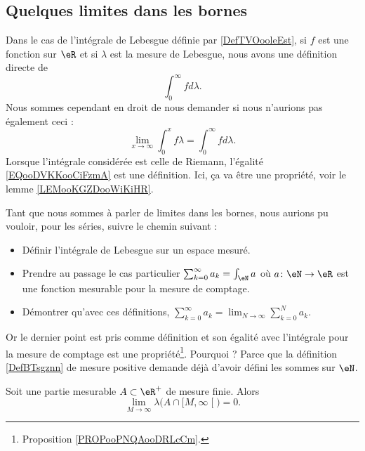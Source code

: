 \subsection{Quelques limites dans les bornes}

Dans le cas de l'intégrale de Lebesgue définie par \ref{DefTVOooleEst}, si \( f\) est une fonction sur \( \eR\) et si \( \lambda\) est la mesure de Lebesgue, nous avons une définition directe de
\begin{equation}
	\int_{0}^{\infty}fd\lambda.
\end{equation}
Nous sommes cependant en droit de nous demander si nous n'aurions pas également ceci :
\begin{equation}        \label{EQooDVKKooCiFzmA}
	\lim_{x\to \infty} \int_0^xf\lambda=\int_0^{\infty}fd\lambda.
\end{equation}
Lorsque l'intégrale considérée est celle de Riemann, l'égalité \eqref{EQooDVKKooCiFzmA} est une définition. Ici, ça va être une propriété, voir le lemme \ref{LEMooKGZDooWiKiHR}.

\begin{normaltext}
	Tant que nous sommes à parler de limites dans les bornes, nous aurions pu vouloir, pour les séries, suivre le chemin suivant :
	\begin{itemize}
		\item Définir l'intégrale de Lebesgue sur un espace mesuré.
		\item Prendre au passage le cas particulier \( \sum_{k=0}^{\infty}a_k=\int_\eN a\) où \( a\colon \eN\to \eR\) est une fonction mesurable pour la mesure de comptage.
		\item Démontrer qu'avec ces définitions, \( \sum_{k=0}^{\infty}a_k=\lim_{N\to \infty} \sum_{k=0}^Na_k\).
	\end{itemize}
	Or le dernier point est pris comme définition et son égalité avec l'intégrale pour la mesure de comptage est une propriété\footnote{Proposition \ref{PROPooPNQAooDRLcCm}.}. Pourquoi ? Parce que la définition \ref{DefBTsgznn} de mesure positive demande déjà d'avoir défini les sommes sur \( \eN\).
\end{normaltext}

\begin{lemma}
	Soit une partie mesurable \( A\subset \eR^+\) de mesure finie. Alors
	\begin{equation}
		\lim_{M\to \infty} \lambda\big( A\cap\mathopen[ M , \infty \mathclose[ \big)=0.
	\end{equation}
\end{lemma}

